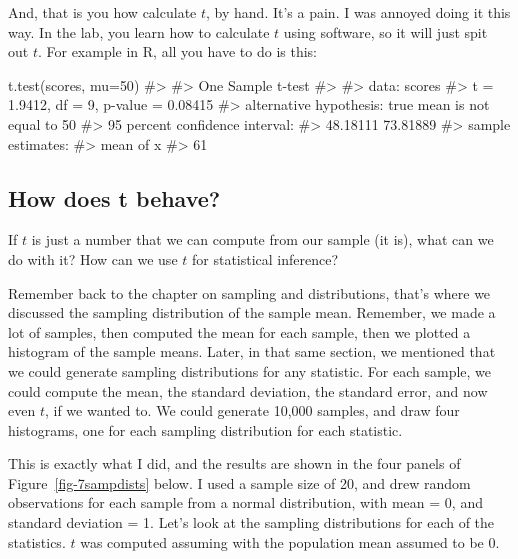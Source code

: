 \documentclass[
  letterpaper,
  DIV=11,
  numbers=noendperiod]{scrreprt}
\newenvironment{Shaded}{\begin{snugshade}}{\end{snugshade}}
\newcommand{\AttributeTok}[1]{\textcolor[rgb]{0.40,0.45,0.13}{#1}}
\newcommand{\CommentTok}[1]{\textcolor[rgb]{0.37,0.37,0.37}{#1}}
\newcommand{\DecValTok}[1]{\textcolor[rgb]{0.68,0.00,0.00}{#1}}
\newcommand{\FunctionTok}[1]{\textcolor[rgb]{0.28,0.35,0.67}{#1}}
\newcommand{\NormalTok}[1]{\textcolor[rgb]{0.00,0.23,0.31}{#1}}
\begin{document}
And, that is you how calculate \(t\), by hand. It's a pain. I was
annoyed doing it this way. In the lab, you learn how to calculate \(t\)
using software, so it will just spit out \(t\). For example in R, all
you have to do is this:

\begin{Shaded}
\begin{Highlighting}[]
\FunctionTok{t.test}\NormalTok{(scores, }\AttributeTok{mu=}\DecValTok{50}\NormalTok{)}
\CommentTok{\#\textgreater{} }
\CommentTok{\#\textgreater{}  One Sample t{-}test}
\CommentTok{\#\textgreater{} }
\CommentTok{\#\textgreater{} data:  scores}
\CommentTok{\#\textgreater{} t = 1.9412, df = 9, p{-}value = 0.08415}
\CommentTok{\#\textgreater{} alternative hypothesis: true mean is not equal to 50}
\CommentTok{\#\textgreater{} 95 percent confidence interval:}
\CommentTok{\#\textgreater{}  48.18111 73.81889}
\CommentTok{\#\textgreater{} sample estimates:}
\CommentTok{\#\textgreater{} mean of x }
\CommentTok{\#\textgreater{}        61}
\end{Highlighting}
\end{Shaded}

\subsection{How does t behave?}\label{how-does-t-behave}

If \(t\) is just a number that we can compute from our sample (it is),
what can we do with it? How can we use \(t\) for statistical inference?

Remember back to the chapter on sampling and distributions, that's where
we discussed the sampling distribution of the sample mean. Remember, we
made a lot of samples, then computed the mean for each sample, then we
plotted a histogram of the sample means. Later, in that same section, we
mentioned that we could generate sampling distributions for any
statistic. For each sample, we could compute the mean, the standard
deviation, the standard error, and now even \(t\), if we wanted to. We
could generate 10,000 samples, and draw four histograms, one for each
sampling distribution for each statistic.

This is exactly what I did, and the results are shown in the four panels
of Figure~\ref{fig-7sampdists} below. I used a sample size of 20, and
drew random observations for each sample from a normal distribution,
with mean = 0, and standard deviation = 1. Let's look at the sampling
distributions for each of the statistics. \(t\) was computed assuming
with the population mean assumed to be 0.
\end{document}
